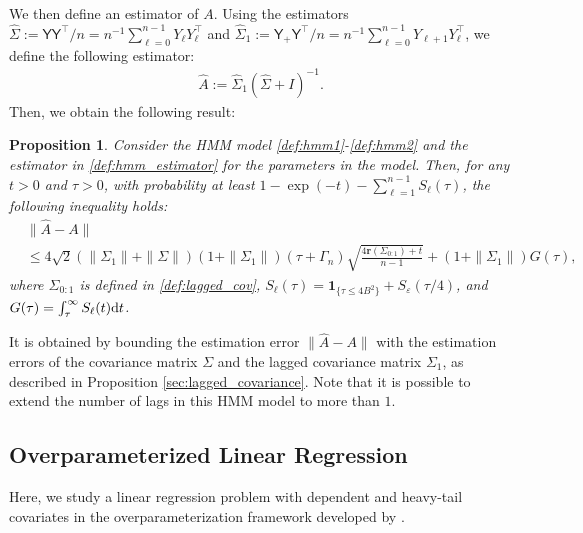\documentclass[11pt,a4paper]{article}
\newtheorem{proposition}[theorem]{Proposition}
\theoremstyle{remark}
\theoremstyle{definition}
\theoremstyle{definition}
\renewcommand{\hat}{\widehat}
\newcommand{\Surv}{S}
\begin{document}
\begin{bibunit}[apalike]
We then define an estimator of $A$.
Using the estimators $\hat{\Sigma} := \mathsf{Y} \mathsf{Y}^\top / n = n^{-1} \sum_{\ell=0}^{n-1} Y_\ell Y_\ell^\top$ and $\hat{\Sigma}_{1} := \mathsf{Y}_+ \mathsf{Y}^\top / n = n^{-1} \sum_{\ell=0}^{n-1} Y_{\ell+1} Y_\ell^\top$,  we define the following estimator:
\begin{align}
    \hat{A} :=  \hat{\Sigma}_{1} (\hat{\Sigma} +  I)^{-1}. \label{def:hmm_estimator}
\end{align}
Then, we obtain the following result:
\begin{proposition} \label{prop:hmm}
    Consider the HMM model \eqref{def:hmm1}-\eqref{def:hmm2} and the estimator in \eqref{def:hmm_estimator} for the parameters in the model.
    Then, for any $t > 0$ and $\tau > 0$, with probability at least $1-\exp(-t)-\sum_{\ell=1}^{n-1} \Surv_\ell(\tau)$, the following inequality holds:
\begin{align*}
    &\|\hat{A} - A\| \\
    &\leq 4\sqrt{2}\left(\|\Sigma_1\| + \|\Sigma\|\right) (1 + \|\Sigma_1\|)\left(\tau+\Gamma_{n}\right)\sqrt{\frac{4 \mathbf{r}\left(\Sigma_{0:1}\right)  +t}{n - 1}} + (1 + \|\Sigma_1\|) G(\tau),
\end{align*}
where $\Sigma_{0:1}$ is defined in \eqref{def:lagged_cov}, $\Surv_\ell(\tau) =  \mathbf{1}_{\{\tau \leq 4B^2\}} +  \Surv_\varepsilon(\tau/4)$, and $G(\tau) = \int_{\tau}^{\infty} \Surv_\ell(t) {\rm d}t$.
\end{proposition}
It is obtained by bounding the estimation error $\|\hat{A} - A\|$ with the estimation errors of the covariance matrix $\Sigma$ and the lagged covariance matrix $\Sigma_1$, as described in Proposition \ref{sec:lagged_covariance}. 
Note that it is possible to extend the number of lags in this HMM model to more than $1$.





\subsection{Overparameterized Linear Regression}

Here, we study a linear regression problem with dependent and heavy-tail covariates in the overparameterization framework developed by \citep{bartlett2020benign}.



\end{bibunit}
\end{document}
